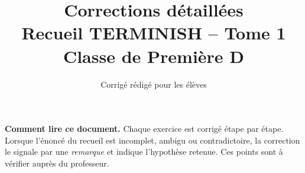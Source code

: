 \documentclass[11pt,a4paper]{article}
\title{Corrections d\'etaill\'ees\\Recueil TERMINISH -- Tome 1\\Classe de Premi\`ere D}
\author{Corrig\'e r\'edig\'e pour les \'el\`eves}
\date{}
\begin{document}
\maketitle

\noindent\textbf{Comment lire ce document.} Chaque exercice est corrig\'e \'etape par \'etape.
Lorsque l'\'enonc\'e du recueil est incomplet, ambigu ou contradictoire, la correction le signale
par une \emph{remarque} et indique l'hypoth\`ese retenue. Ces points sont \`a v\'erifier aupr\`es du professeur.

\tableofcontents
\newpage




\end{document}
